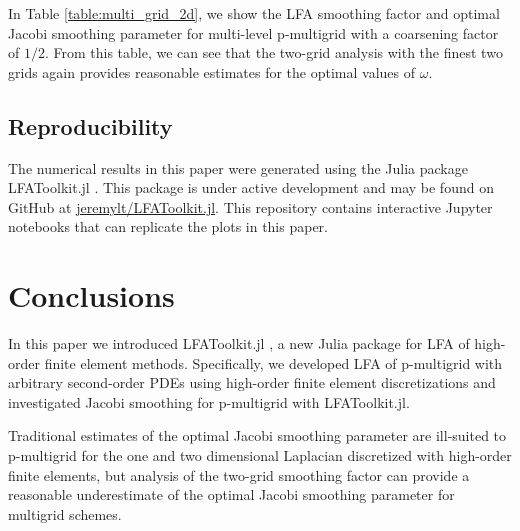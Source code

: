 \documentclass[review]{siamart190516}
\begin{document}
In Table \ref{table:multi_grid_2d}, we show the LFA smoothing factor and optimal Jacobi smoothing parameter for multi-level p-multigrid with a coarsening factor of $1/2$.
From this table, we can see that the two-grid analysis with the finest two grids again provides reasonable estimates for the optimal values of $\omega$.

\subsection{Reproducibility}\label{sec:reproducibility}

The numerical results in this paper were generated using the Julia package LFAToolkit.jl \cite{thompson2021toolkit}.
This package is under active development and may be found on GitHub at \href{https://github.com/jeremylt/LFAToolkit.jl}{jeremylt/LFAToolkit.jl}.
This repository contains interactive Jupyter notebooks that can replicate the plots in this paper.

\section{Conclusions}\label{sec:conclusion}

In this paper we introduced LFAToolkit.jl \cite{thompson2021toolkit}, a new Julia package for LFA of high-order finite element methods.
Specifically, we developed LFA of p-multigrid with arbitrary second-order PDEs using high-order finite element discretizations and investigated Jacobi smoothing for p-multigrid with LFAToolkit.jl.

Traditional estimates of the optimal Jacobi smoothing parameter are ill-suited to p-multigrid for the one and two dimensional Laplacian discretized with high-order finite elements, but analysis of the two-grid smoothing factor can provide a reasonable underestimate of the optimal Jacobi smoothing parameter for multigrid schemes.



\end{document}
